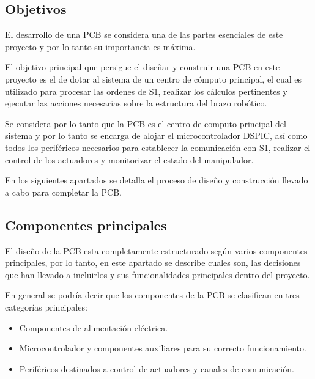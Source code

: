 \subsection{Objetivos}

El desarrollo de una PCB se considera una de las partes esenciales de este proyecto y por lo tanto su importancia es máxima.

El objetivo principal que persigue el diseñar y construir una PCB en este proyecto es el de dotar al sistema de un centro de cómputo principal, el cual es utilizado para procesar las ordenes de S1, realizar los cálculos pertinentes y ejecutar las acciones necesarias sobre la estructura del brazo robótico.

Se considera  por lo tanto que la PCB es el centro de computo principal del sistema y por lo tanto se encarga de alojar el microcontrolador DSPIC, así como todos los periféricos necesarios para establecer la comunicación con S1, realizar el control de los actuadores y monitorizar el estado del manipulador.

En los siguientes apartados se detalla el proceso de diseño y construcción llevado a cabo para completar la PCB.

\subsection{Componentes principales}

El diseño de la PCB esta completamente estructurado según varios componentes principales, por lo tanto, en este apartado se describe cuales son, las decisiones que han llevado a incluirlos y sus funcionalidades principales dentro del proyecto.

En general se podría decir que los componentes de la PCB se clasifican en tres categorías principales:
\begin{itemize}
    \item Componentes de alimentación eléctrica.
    \item Microcontrolador y componentes auxiliares para su correcto funcionamiento.
    \item Periféricos destinados a control de actuadores y canales de comunicación.
\end{itemize}

